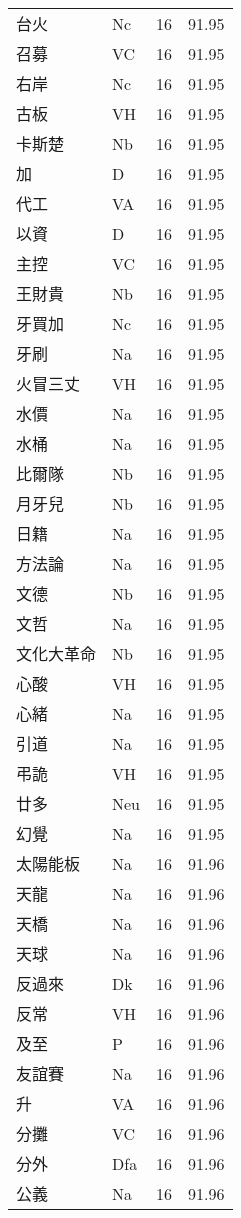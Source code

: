 \documentclass[twocolumn]{book}
\begin{document}
\begin{supertabular}{llrr}
台火 & Nc & 16 &  91.95\\
召募 & VC & 16 &  91.95\\
右岸 & Nc & 16 &  91.95\\
古板 & VH & 16 &  91.95\\
卡斯楚 & Nb & 16 &  91.95\\
加 & D & 16 &  91.95\\
代工 & VA & 16 &  91.95\\
以資 & D & 16 &  91.95\\
主控 & VC & 16 &  91.95\\
王財貴 & Nb & 16 &  91.95\\
牙買加 & Nc & 16 &  91.95\\
牙刷 & Na & 16 &  91.95\\
火冒三丈 & VH & 16 &  91.95\\
水價 & Na & 16 &  91.95\\
水桶 & Na & 16 &  91.95\\
比爾隊 & Nb & 16 &  91.95\\
月牙兒 & Nb & 16 &  91.95\\
日籍 & Na & 16 &  91.95\\
方法論 & Na & 16 &  91.95\\
文德 & Nb & 16 &  91.95\\
文哲 & Na & 16 &  91.95\\
文化大革命 & Nb & 16 &  91.95\\
心酸 & VH & 16 &  91.95\\
心緒 & Na & 16 &  91.95\\
引道 & Na & 16 &  91.95\\
弔詭 & VH & 16 &  91.95\\
廿多 & Neu & 16 &  91.95\\
幻覺 & Na & 16 &  91.95\\
太陽能板 & Na & 16 &  91.96\\
天龍 & Na & 16 &  91.96\\
天橋 & Na & 16 &  91.96\\
天球 & Na & 16 &  91.96\\
反過來 & Dk & 16 &  91.96\\
反常 & VH & 16 &  91.96\\
及至 & P & 16 &  91.96\\
友誼賽 & Na & 16 &  91.96\\
升 & VA & 16 &  91.96\\
分攤 & VC & 16 &  91.96\\
分外 & Dfa & 16 &  91.96\\
公義 & Na & 16 &  91.96\\

\end{supertabular}
\end{document}
